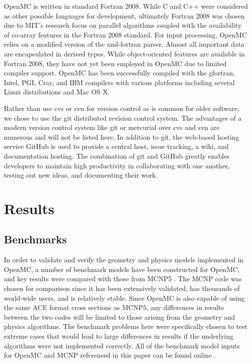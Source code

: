\documentclass[authoryear,preprint]{elsarticle}
\begin{document}
OpenMC is written in standard Fortran 2008. While C and C++ were considered as
other possible languages for development, ultimately Fortran 2008 was chosen due
to MIT's research focus on parallel algorithms coupled with the availability of
co-array features in the Fortran 2008 standard. For input processing, OpenMC
relies on a modified version of the xml-fortran \citep{xml-fortran}
parser. Almost all important data are encapsulated in derived types. While
object-oriented features are available in Fortran 2008, they have not yet been
employed in OpenMC due to limited compiler support. OpenMC has been successfully
compiled with the gfortran, Intel, PGI, Cray, and IBM compilers with various
platforms including several Linux distributions and Mac OS X.

Rather than use cvs or svn for version control as is common for older software,
we chose to use the git distributed revision control system. The advantages of a
modern version control system like git or mercurial over cvs and svn are
numerous and will not be listed here. In addition to git, the web-based hosting
service GitHub is used to provide a central host, issue tracking, a wiki, and
documentation hosting. The combination of git and GitHub greatly enables
developers to maintain high productivity in collaborating with one another,
testing out new ideas, and documenting their work.

\section{Results}

\subsection{Benchmarks}

In order to validate and verify the geometry and physics models implemented in
OpenMC, a number of benchmark models have been constructed for OpenMC, and key
results were compared with those from MCNP5 \citep{mcnp}. The MCNP code was
chosen for comparison since it has been extensively validated, has thousands of
world-wide users, and is relatively stable. Since OpenMC is also capable of
using the same ACE format cross sections as MCNP5, any differences in results
between the two codes will be limited to those arising from the geometry and
physics algorithms. The benchmark problems here were specifically chosen to test
extreme cases that would lead to large differences in results if the underlying
algorithms were not implemented correctly. All of the benchmark model inputs for
OpenMC and MCNP referenced in this paper can be found online \citep{benchmarks}.
\end{document}
